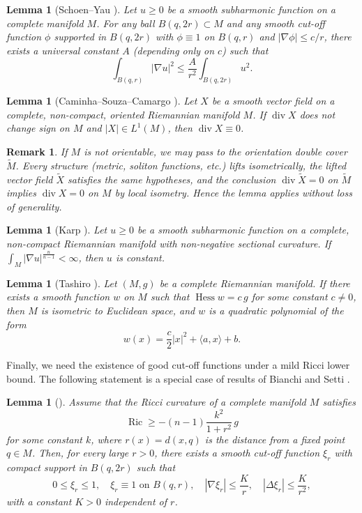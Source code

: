 \documentclass[10pt,a4paper]{amsart}
\newcommand{\Ric}{\operatorname{Ric}}
\newcommand{\Hess}{\operatorname{Hess}}
\newcommand{\divg}{\operatorname{div}}
\newtheorem{lemma}[theorem]{Lemma}
\newtheorem{remark}[theorem]{Remark}
\begin{document}
\begin{lemma}[Schoen--Yau \cite{SchoenYau}]\label{lem:SY}
Let $u\ge 0$ be a smooth subharmonic function on a complete manifold $M$.
For any ball $B(q,2r)\subset M$ and any smooth cut-off function $\phi$ supported in $B(q,2r)$ with $\phi\equiv 1$ on $B(q,r)$ and $|\nabla\phi|\le c/r$, there exists a universal constant $A$ (depending only on $c$) such that
\[
\int_{B(q,r)}|\nabla u|^2 \le \frac{A}{r^2}\int_{B(q,2r)} u^2.
\]
\end{lemma}

\begin{lemma}[Caminha--Souza--Camargo \cite{Caminha}]\label{lem:CSC}
Let $X$ be a smooth vector field on a complete, non-compact, oriented Riemannian manifold $M$.
If $\divg X$ does not change sign on $M$ and $|X|\in L^1(M)$, then $\divg X\equiv 0$.
\end{lemma}
\begin{remark}
If $M$ is not orientable, we may pass to the orientation double cover $\widetilde M$.
Every structure (metric, soliton functions, etc.) lifts isometrically, the lifted vector field $\widetilde X$ satisfies the same hypotheses, and the conclusion $\divg \widetilde X=0$ on $\widetilde M$ implies $\divg X=0$ on $M$ by local isometry.
Hence the lemma applies without loss of generality.
\end{remark}

\begin{lemma}[Karp \cite{Karp}]\label{lem:Karp}
Let $u\ge 0$ be a smooth subharmonic function on a complete, non-compact Riemannian manifold with non-negative sectional curvature.
If $\int_M |\nabla u|^{\frac{n}{n-1}} < \infty$, then $u$ is constant.
\end{lemma}

\begin{lemma}[Tashiro \cite{Tashiro}]\label{lem:Tashiro}
Let $(M,g)$ be a complete Riemannian manifold.
If there exists a smooth function $w$ on $M$ such that $\Hess w = c\,g$ for some constant $c\neq 0$, then $M$ is isometric to Euclidean space, and $w$ is a quadratic polynomial of the form
\[
w(x) = \frac{c}{2}|x|^2 + \langle a, x\rangle + b.
\]
\end{lemma}

Finally, we need the existence of good cut-off functions under a mild Ricci lower bound.
The following statement is a special case of results of Bianchi and Setti \cite{Bianchi}.

\begin{lemma}[{\cite[Corollary 2.3]{Bianchi}}]\label{lem:Bianchi}
Assume that the Ricci curvature of a complete manifold $M$ satisfies
\[
\Ric \ge -(n-1)\frac{k^2}{1+r^2}\, g
\]
for some constant $k$, where $r(x)=d(x,q)$ is the distance from a fixed point $q\in M$.
Then, for every large $r>0$, there exists a smooth cut-off function $\xi_r$ with compact support in $B(q,2r)$ such that
\[
0\le \xi_r\le 1,\quad \xi_r\equiv 1 \text{ on } B(q,r),\quad
|\nabla\xi_r|\le \frac{K}{r},\quad |\Delta\xi_r|\le \frac{K}{r^2},
\]
with a constant $K>0$ independent of $r$.
\end{lemma}
\end{document}

